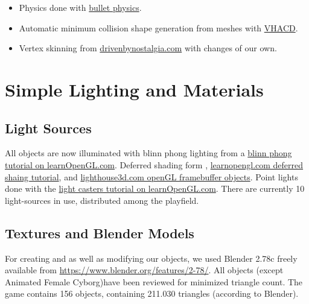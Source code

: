 \documentclass[12pt]{article}
\begin{document}
\begin{itemize}
  \item Physics done with \href{http://bulletphysics.org/wordpress/}{bullet physics}.

  \item Automatic minimum collision shape generation from meshes with \href{https://github.com/kmammou/v-hacd}{VHACD}.

  \item Vertex skinning from \href{http://drivenbynostalgia.com/}{drivenbynostalgia.com} with changes of our own.
\end{itemize}


\section{Simple Lighting and Materials}


\subsection{Light Sources \label{lightSources}}
All objects are now illuminated with blinn phong lighting from a \href{http://learnopengl.com/#!Advanced-Lighting/Advanced-Lighting}{blinn phong tutorial on learnOpenGL.com}. Deferred shading form \cite{openGLSuperBible}, \href{http://learnopengl.com/#!Advanced-Lighting/Deferred-Shading}{learnopengl.com deferred shaing tutorial}, and \href{http://www.lighthouse3d.com/tutorials/opengl_framebuffer_objects/}{lighthouse3d.com openGL framebuffer objects}.
Point lights done with the \href{http://learnopengl.com/#!Lighting/Light-casters}{light casters tutorial on learnOpenGL.com}. There are currently 10 light-sources in use, distributed among the playfield.


\subsection{Textures and Blender Models}

For creating and as well as modifying our objects, we used Blender 2.78c freely available from \url{https://www.blender.org/features/2-78/}. All objects (except Animated Female Cyborg)have been reviewed for minimized triangle count. The game contains 156 objects, containing 211.030 triangles (according to Blender).
\end{document}
